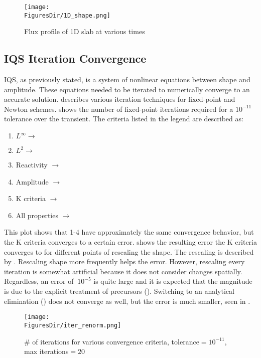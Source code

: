 \begin{figure}[!htbp]
\begin{center}
\texttt{[image: \\FiguresDir/1D\_shape.png]}
\caption{Flux profile of 1D slab at various times}
\label{fig:1D_shape}
\end{center}
\end{figure}

\subsection{IQS Iteration Convergence}

IQS, as previously stated, is a system of nonlinear equations between shape and amplitude. These equations needed to be iterated to numerically converge to an accurate solution.   describes various iteration techniques for fixed-point and Newton schemes.  shows the number of fixed-point iterations required for a $10^{-11}$ tolerance over the transient. The criteria listed in the legend are described as:
\begin{enumerate}
\item $L^{\infty} \rightarrow$ 
\item $L^{2} \rightarrow$ 
\item Reactivity $\rightarrow$ 
\item Amplitude $\rightarrow$ 
\item K criteria $\rightarrow$ 
\item All properties $\rightarrow$ 
\end{enumerate}
This plot shows that 1-4 have approximately the same convergence behavior, but the K criteria converges to a certain error.  shows the resulting error the K criteria converges to for different points of rescaling the shape. The rescaling is described by . Rescaling shape more frequently helps the error.  However, rescaling every iteration is somewhat artificial because it does not consider changes spatially. Regardless, an error of $~10^{-5}$ is quite large and it is expected that the magnitude is due to the explicit treatment of precursors (). Switching to an analytical elimination () does not converge as well, but the error is much smaller, seen in .

\begin{figure}[!htbp]
\centering
\texttt{[image: \\FiguresDir/iter\_renorm.png]}
\caption{\# of iterations for various convergence criteria, tolerance$=10^{-11}$, max iterations$=20$}
\label{fig:iter}
\end{figure}

